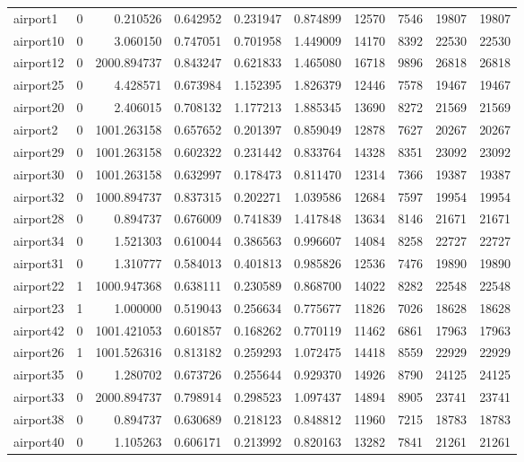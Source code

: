 \begin{longtable}{|l|r|r|r|r|r|r|r|r|r|}
airport1 & 0 & 0.210526 & 0.642952 & 0.231947 & 0.874899 & 12570 & 7546 & 19807 & 19807 \\
airport10 & 0 & 3.060150 & 0.747051 & 0.701958 & 1.449009 & 14170 & 8392 & 22530 & 22530 \\
airport12 & 0 & 2000.894737 & 0.843247 & 0.621833 & 1.465080 & 16718 & 9896 & 26818 & 26818 \\
airport25 & 0 & 4.428571 & 0.673984 & 1.152395 & 1.826379 & 12446 & 7578 & 19467 & 19467 \\
airport20 & 0 & 2.406015 & 0.708132 & 1.177213 & 1.885345 & 13690 & 8272 & 21569 & 21569 \\
airport2 & 0 & 1001.263158 & 0.657652 & 0.201397 & 0.859049 & 12878 & 7627 & 20267 & 20267 \\
airport29 & 0 & 1001.263158 & 0.602322 & 0.231442 & 0.833764 & 14328 & 8351 & 23092 & 23092 \\
airport30 & 0 & 1001.263158 & 0.632997 & 0.178473 & 0.811470 & 12314 & 7366 & 19387 & 19387 \\
airport32 & 0 & 1000.894737 & 0.837315 & 0.202271 & 1.039586 & 12684 & 7597 & 19954 & 19954 \\
airport28 & 0 & 0.894737 & 0.676009 & 0.741839 & 1.417848 & 13634 & 8146 & 21671 & 21671 \\
airport34 & 0 & 1.521303 & 0.610044 & 0.386563 & 0.996607 & 14084 & 8258 & 22727 & 22727 \\
airport31 & 0 & 1.310777 & 0.584013 & 0.401813 & 0.985826 & 12536 & 7476 & 19890 & 19890 \\
airport22 & 1 & 1000.947368 & 0.638111 & 0.230589 & 0.868700 & 14022 & 8282 & 22548 & 22548 \\
airport23 & 1 & 1.000000 & 0.519043 & 0.256634 & 0.775677 & 11826 & 7026 & 18628 & 18628 \\
airport42 & 0 & 1001.421053 & 0.601857 & 0.168262 & 0.770119 & 11462 & 6861 & 17963 & 17963 \\
airport26 & 1 & 1001.526316 & 0.813182 & 0.259293 & 1.072475 & 14418 & 8559 & 22929 & 22929 \\
airport35 & 0 & 1.280702 & 0.673726 & 0.255644 & 0.929370 & 14926 & 8790 & 24125 & 24125 \\
airport33 & 0 & 2000.894737 & 0.798914 & 0.298523 & 1.097437 & 14894 & 8905 & 23741 & 23741 \\
airport38 & 0 & 0.894737 & 0.630689 & 0.218123 & 0.848812 & 11960 & 7215 & 18783 & 18783 \\
airport40 & 0 & 1.105263 & 0.606171 & 0.213992 & 0.820163 & 13282 & 7841 & 21261 & 21261 \\

\end{longtable}

